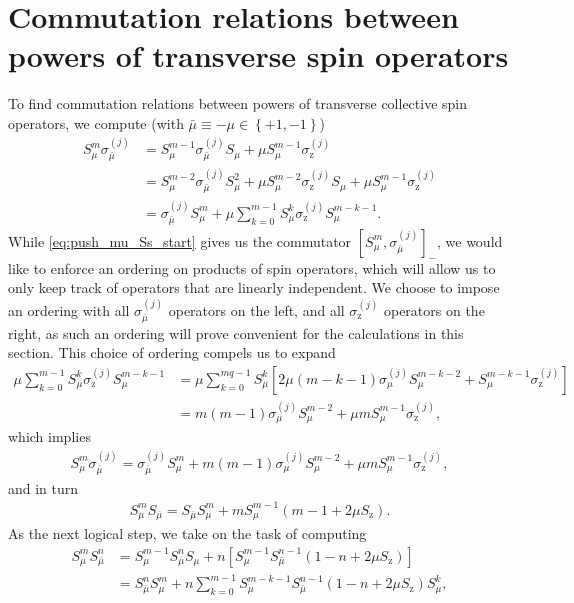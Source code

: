 \documentclass[aps,notitlepage,nofootinbib,11pt]{revtex4-1}
\newcommand{\p}[1]{\left(#1\right)} %
\renewcommand{\sp}[1]{\left[#1\right]} %
\renewcommand{\set}[1]{\left\{#1\right\}} %
\newcommand{\z}{\text{z}}
\newcommand{\bmu}{{\bar\mu}}
\newcommand{\1}{\mathds{1}}
\begin{document}
\section{Commutation relations between powers of transverse spin
  operators}
\label{sec:comm_transverse}

To find commutation relations between powers of transverse collective
spin operators, we compute (with $\bmu\equiv-\mu\in\set{+1,-1}$)
\begin{align}
  S_\mu^m \sigma_\bmu^{(j)}
  &= S_\mu^{m-1}\sigma_\bmu^{(j)} S_\mu
  + \mu S_\mu^{m-1} \sigma_\z^{(j)} \\
  &= S_\mu^{m-2} \sigma_\bmu^{(j)} S_\mu^2
  + \mu S_\mu^{m-2} \sigma_\z^{(j)} S_\mu
  + \mu S_\mu^{m-1} \sigma_\z^{(j)} \\
  &= \sigma_\bmu^{(j)} S_\mu^m
  + \mu \sum_{k=0}^{m-1} S_\mu^k \sigma_\z^{(j)} S_\mu^{m-k-1}
  \label{eq:push_mu_Ss_start}.
\end{align}
While \eqref{eq:push_mu_Ss_start} gives us the commutator
$\sp{S_\mu^m,\sigma_\bmu^{(j)}}_-$, we would like to enforce an
ordering on products of spin operators, which will allow us to only
keep track of operators that are linearly independent.  We choose to
impose an ordering with all $\sigma_\bmu^{(j)}$ operators on the left,
and all $\sigma_\z^{(j)}$ operators on the right, as such an ordering
will prove convenient for the calculations in this section.  This
choice of ordering compels us to expand
\begin{align}
  \mu \sum_{k=0}^{m-1} S_\mu^k \sigma_\z^{(j)} S_\mu^{m-k-1}
  &= \mu \sum_{k=0}^{mq-1} S_\mu^k
  \sp{2\mu\p{m-k-1} \sigma_\mu^{(j)} S_\mu^{m-k-2}
    + S_\mu^{m-k-1} \sigma_\z^{(j)}} \\
  &= m \p{m-1} \sigma_\mu^{(j)} S_\mu^{m-2}
  + \mu m S_\mu^{m-1} \sigma_\z^{(j)},
\end{align}
which implies
\begin{align}
  S_\mu^m \sigma_\bmu^{(j)}
  = \sigma_\bmu^{(j)} S_\mu^m + m \p{m-1} \sigma_\mu^{(j)} S_\mu^{m-2}
  + \mu m S_\mu^{m-1} \sigma_\z^{(j)},
  \label{eq:push_mu_Ss}
\end{align}
and in turn
\begin{align}
  S_\mu^m S_\bmu = S_\bmu S_\mu^m
  + m S_\mu^{m-1} \p{m - 1 + 2\mu S_\z}.
  \label{eq:push_mu_single}
\end{align}
As the next logical step, we take on the task of computing
\begin{align}
  S_\mu^m S_\bmu^n
  &= S_\mu^{m-1} S_\bmu^n S_\mu
  + n \sp{S_\mu^{m-1} S_\bmu^{n-1} \p{1 - n + 2\mu S_\z}} \\
  &= S_\bmu^n S_\mu^m
  + n \sum_{k=0}^{m-1} S_\mu^{m-k-1} S_\bmu^{n-1}
  \p{1 - n + 2\mu S_\z} S_\mu^k,
\end{align}
\end{document}
